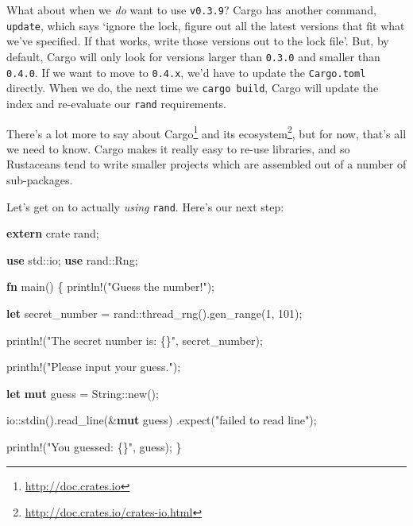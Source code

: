 \documentclass[a4paper,]{book}
\newenvironment{Shaded}{\begin{snugshade}}{\end{snugshade}}
\newcommand{\KeywordTok}[1]{\textcolor[rgb]{0.13,0.29,0.53}{\textbf{{#1}}}}
\newcommand{\DecValTok}[1]{\textcolor[rgb]{0.00,0.00,0.81}{{#1}}}
\newcommand{\StringTok}[1]{\textcolor[rgb]{0.31,0.60,0.02}{{#1}}}
\newcommand{\OtherTok}[1]{\textcolor[rgb]{0.56,0.35,0.01}{{#1}}}
\newcommand{\NormalTok}[1]{{#1}}
\renewcommand{\href}[2]{#2\footnote{\url{#1}}}
\begin{document}
What about when we \emph{do} want to use \texttt{v0.3.9}? Cargo has
another command, \texttt{update}, which says `ignore the lock, figure
out all the latest versions that fit what we've specified. If that
works, write those versions out to the lock file'. But, by default,
Cargo will only look for versions larger than \texttt{0.3.0} and smaller
than \texttt{0.4.0}. If we want to move to \texttt{0.4.x}, we'd have to
update the \texttt{Cargo.toml} directly. When we do, the next time we
\texttt{cargo\ build}, Cargo will update the index and re-evaluate our
\texttt{rand} requirements.

There's a lot more to say about \href{http://doc.crates.io}{Cargo} and
\href{http://doc.crates.io/crates-io.html}{its ecosystem}, but for now,
that's all we need to know. Cargo makes it really easy to re-use
libraries, and so Rustaceans tend to write smaller projects which are
assembled out of a number of sub-packages.

Let's get on to actually \emph{using} \texttt{rand}. Here's our next
step:

\begin{Shaded}
\begin{Highlighting}[]
\KeywordTok{extern} \NormalTok{crate rand;}

\KeywordTok{use} \NormalTok{std::io;}
\KeywordTok{use} \NormalTok{rand::Rng;}

\KeywordTok{fn} \NormalTok{main() \{}
    \OtherTok{println!}\NormalTok{(}\StringTok{"Guess the number!"}\NormalTok{);}

    \KeywordTok{let} \NormalTok{secret_number = rand::thread_rng().gen_range(}\DecValTok{1}\NormalTok{, }\DecValTok{101}\NormalTok{);}

    \OtherTok{println!}\NormalTok{(}\StringTok{"The secret number is: \{\}"}\NormalTok{, secret_number);}

    \OtherTok{println!}\NormalTok{(}\StringTok{"Please input your guess."}\NormalTok{);}

    \KeywordTok{let} \KeywordTok{mut} \NormalTok{guess = String::new();}

    \NormalTok{io::stdin().read_line(&}\KeywordTok{mut} \NormalTok{guess)}
        \NormalTok{.expect(}\StringTok{"failed to read line"}\NormalTok{);}

    \OtherTok{println!}\NormalTok{(}\StringTok{"You guessed: \{\}"}\NormalTok{, guess);}
\NormalTok{\}}
\end{Highlighting}
\end{Shaded}
\end{document}
